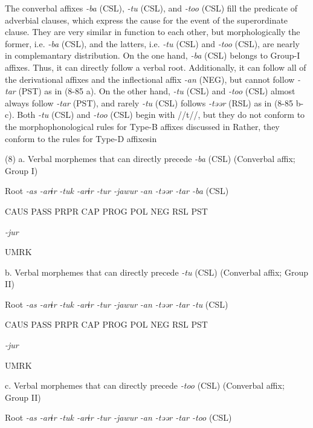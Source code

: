The converbal affixes \textit{{}-ba} (CSL), \textit{{}-tu} (CSL), and \textit{{}-too} (CSL) fill the predicate of adverbial clauses, which express the cause for the event of the superordinate clause. They are very similar in function to each other, but morphologically the former, i.e. \textit{{}-ba} (CSL), and the latters, i.e. \textit{{}-tu} (CSL) and \textit{{}-too} (CSL), are nearly in complemantary distribution. On the one hand, \textit{{}-ba} (CSL) belongs to Group-I affixes. Thus, it can directly follow a verbal root. Additionally, it can follow all of the derivational affixes and the inflectional affix \textit{{}-an} (NEG), but cannot follow \textit{{}-tar} (PST) as in (8-85 a). On the other hand, \textit{{}-tu} (CSL) and \textit{{}-too} (CSL) almost always follow \textit{{}-tar} (PST), and rarely \textit{{}-tu} (CSL) follows \textit{{}-təər} (RSL) as in (8-85 b-c). Both \textit{-tu} (CSL) and \textit{{}-too} (CSL) begin with //t//, but they do not conform to the morphophonological rules for Type-B affixes discussed in  Rather, they conform to the rules for Type-D affixesin 

(8)  a. Verbal morphemes that can directly precede \textit{{}-ba} (CSL) (Converbal affix; Group I)

  Root  \textit{{}-as  {}-arɨr} %
\textit{{}-tuk  {}-arɨr  {}-tur  {}-jawur} %
\textit{{}-an  {}-təər  {}-tar  {}-ba} (CSL)

    CAUS  PASS  PRPR  CAP  PROG  POL  NEG  RSL  PST  

          \textit{{}-jur} 

          UMRK    

  b. Verbal morphemes that can directly precede \textit{{}-tu} (CSL) (Converbal affix; Group II)

  Root  \textit{{}-as  {}-arɨr} %
\textit{{}-tuk  {}-arɨr  {}-tur  {}-jawur} %
\textit{{}-an  {}-təər  {}-tar  {}-tu} (CSL)

    CAUS  PASS  PRPR  CAP  PROG  POL  NEG  RSL  PST  

          \textit{{}-jur} 

          UMRK    

  c. Verbal morphemes that can directly precede \textit{{}-too} (CSL) (Converbal affix; Group II)

  Root  \textit{{}-as  {}-arɨr} %
\textit{{}-tuk  {}-arɨr  {}-tur  {}-jawur} %
\textit{{}-an  {}-təər  {}-tar  {}-too} (CSL)


